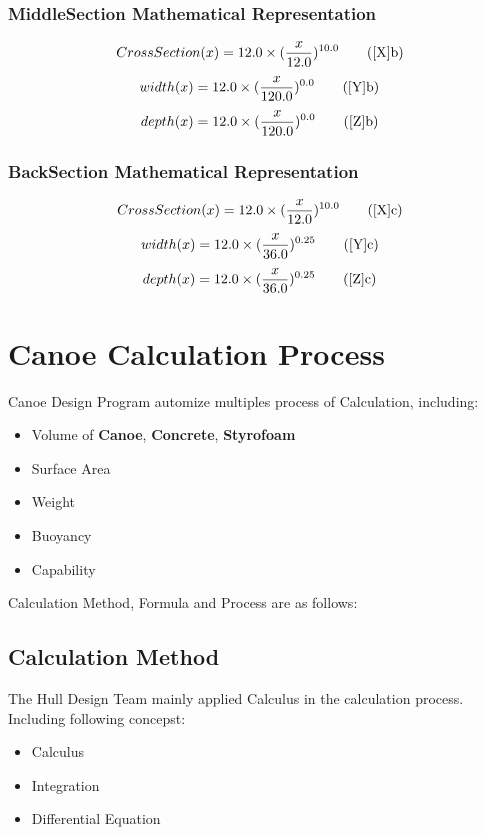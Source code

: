 \documentclass{article}%
\begin{document}
%
\subsubsection{MiddleSection Mathematical Representation}%
\label{ssubsec:MiddleSectionMathematicalRepresentation}%
\begin{equation}%
CrossSection(x) = 12.0\times(\frac{x}{12.0})^{10.0} \tag{\ref{X}{b}}%
\end{equation}%
\begin{equation}%
width(x) = 12.0\times(\frac{x}{120.0})^{0.0} \tag{\ref{Y}{b}}%
\end{equation}%
\begin{equation}%
depth(x) = 12.0\times(\frac{x}{120.0})^{0.0} \tag{\ref{Z}{b}}%
\end{equation}

%
\subsubsection{BackSection Mathematical Representation}%
\label{ssubsec:BackSectionMathematicalRepresentation}%
\begin{equation}%
CrossSection(x) = 12.0\times(\frac{x}{12.0})^{10.0} \tag{\ref{X}{c}}%
\end{equation}%
\begin{equation}%
width(x) = 12.0\times(\frac{x}{36.0})^{0.25} \tag{\ref{Y}{c}}%
\end{equation}%
\begin{equation}%
depth(x) = 12.0\times(\frac{x}{36.0})^{0.25} \tag{\ref{Z}{c}}%
\end{equation}

%
\section{Canoe Calculation Process}%
\label{sec:CanoeCalculationProcess}%
Canoe Design Program automize multiples process of Calculation, including: %
\begin{itemize}%
\item%
Volume of \textbf{Canoe}, \textbf{Concrete}, \textbf{Styrofoam}%
\item%
Surface Area%
\item%
Weight%
\item%
Buoyancy%
\item%
Capability%
\end{itemize}%
Calculation Method, Formula and Process are as follows: %
\subsection{Calculation Method}%
\label{subsec:CalculationMethod}%
The Hull Design Team mainly applied Calculus in the calculation process. Including following concepst:%
\begin{itemize}%
\item%
Calculus%
\item%
Integration%
\item%
Differential Equation%
\end{itemize}%
\end{document}
